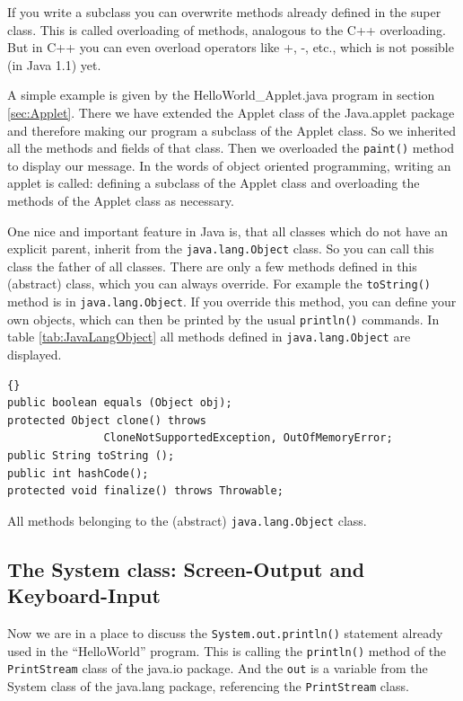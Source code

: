 If you write a subclass you can overwrite methods already defined
in the super class. This is called overloading of methods,
analogous to the C++ overloading. But in C++ you can even
overload operators like +, -, etc., which is not possible (in Java 1.1) yet.

A simple example is given by the
HelloWorld\_Applet.java program in section \ref{sec:Applet}.
There we have extended the Applet class of the Java.applet package
and therefore making our program a subclass of the Applet class.
So we inherited all the methods and fields of that class. Then we
overloaded the \verb|paint()| method to display our message. 
In the words of object oriented programming, writing an applet is
called: defining a subclass of the Applet class and overloading
the methods of the Applet class as necessary.

One nice and important feature in Java is, that all classes which
do not have an explicit parent, inherit from the \verb|java.lang.Object| 
class. So you can call this class the father of all classes.
There are only a few methods defined in this (abstract) class,
which you can always override. For example the \verb|toString()| 
method is in \verb|java.lang.Object|. If you override this method,
you can define your own objects, which can then be printed by
the usual \verb|println()| commands. In table \ref{tab:JavaLangObject}
all methods defined in \verb|java.lang.Object| are displayed.
\begin{table}[htbp]
  \begin{center}
\begin{lstlisting}{}
public boolean equals (Object obj);
protected Object clone() throws 
               CloneNotSupportedException, OutOfMemoryError;
public String toString ();
public int hashCode(); 
protected void finalize() throws Throwable;
\end{lstlisting}
    \caption{All methods belonging to the (abstract) 
               \texttt{java.lang.Object} class.}
    \label{tab:JavaLangObject}
  \end{center}
\end{table}

\subsection{The System class: Screen-Output and Keyboard-Input}

Now we are in a place to discuss the \verb|System.out.println()| statement
already used in the ``HelloWorld'' program. This is calling the
\verb|println()| method of the \verb|PrintStream| class of the java.io 
package. And the \verb|out| is a variable from the System 
class of the java.lang package, referencing the \verb|PrintStream| class. 

